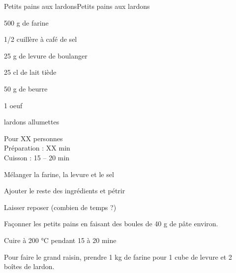 \begin{recette}{Petits pains aux lardons}{Petits pains aux lardons}

\begin{ingredients}
500 g de farine\par
1/2 cuillère à café de sel\par
25 g de levure de boulanger\par
25 cl de lait tiède\par
50 g de beurre\par
1 oeuf\par
lardons allumettes\par
\end{ingredients}

\begin{infos}
Pour XX personnes\\
Préparation : XX min\\
Cuisson : 15 -- 20 min\\
\end{infos}

\begin{etapes}
\item Mélanger la farine, la levure et le sel
\item Ajouter le reste des ingrédients et pétrir
\item Laisser reposer (combien de temps ?)
\item Façonner les petits pains en faisant des boules de 40 g de pâte environ.
\item Cuire à 200 °C pendant 15 à 20 mine
\end{etapes}

\begin{conseils}
Pour faire le grand raisin, prendre 1 kg de farine pour 1 cube de levure et 2 boîtes de lardon.
\end{conseils}

\end{recette}